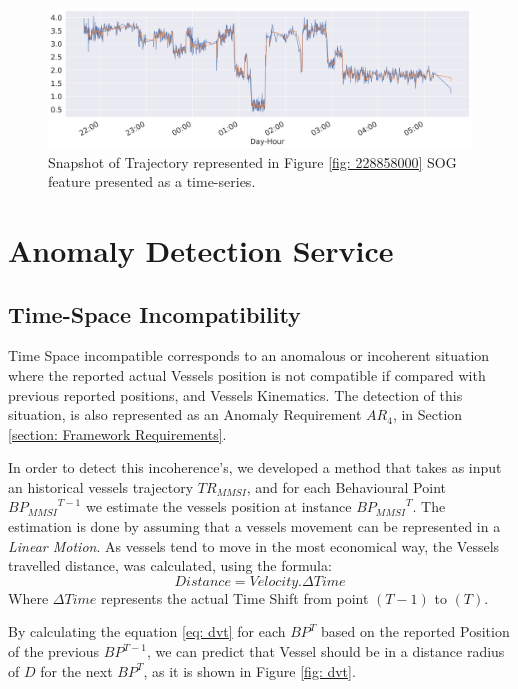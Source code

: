 \begin{figure}[H]
\centering
\includegraphics[width=\textwidth]{figures/Ch3/ts_smoothed.png}
\caption{Snapshot of Trajectory represented in Figure \ref{fig: 228858000} SOG feature presented as a time-series.}
\label{fig: 228858000 ts smoothed}
\end{figure}

\section{Anomaly Detection Service}
\subsection{Time-Space Incompatibility}
\label{subsection: 4 Time-Space Incompatibility}
Time Space incompatible corresponds to an anomalous or incoherent situation where the reported actual Vessels position is not compatible if compared with previous reported positions, and Vessels Kinematics. The detection of this situation, is also represented as an Anomaly Requirement \emph{$AR_4$}, in Section \ref{section: Framework Requirements}.

In order to detect this incoherence's, we developed a method that takes as input an historical vessels trajectory $TR_{MMSI}$, and for each Behavioural Point ${BP_{MMSI}}^{T-1}$ we estimate the vessels position at instance ${BP_{MMSI}}^{T}$.
The estimation is done by assuming that a vessels movement can be represented in a \emph{Linear Motion}. As vessels tend to move in the most economical way, the Vessels travelled distance, was calculated, using the formula:
\begin{equation}
Distance = Velocity . \Delta Time
\label{eq: dvt}
\end{equation}
Where $\Delta Time$ represents the actual Time Shift from point $(T-1)$ to $(T)$.

By calculating the equation \ref{eq: dvt} for each $BP^{T}$ based on the reported Position of the previous $BP^{T-1}$, we can predict that Vessel should be in a distance radius of $D$ for the next $BP^T$, as it is shown in Figure \ref{fig: dvt}.

